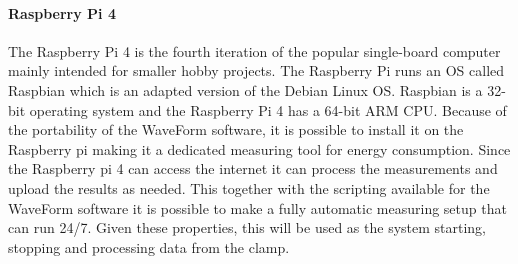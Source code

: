 \paragraph*{Raspberry Pi 4}
The Raspberry Pi 4\cite{RaspberryPi4} is the fourth iteration of the popular single-board computer mainly intended for smaller hobby projects. The Raspberry Pi runs an OS called Raspbian which is an adapted version of the Debian Linux OS. Raspbian is a 32-bit operating system and the Raspberry Pi 4 has a 64-bit ARM CPU.\cite{RaspberryPi4} Because of the portability of the WaveForm software, it is possible to install it on the Raspberry pi making it a dedicated measuring tool for energy consumption. Since the Raspberry pi 4 can access the internet it can process the measurements and upload the results as needed. This together with the scripting available for the WaveForm software it is possible to make a fully automatic measuring setup that can run 24/7. Given these properties, this will be used as the system starting, stopping and processing data from the clamp.